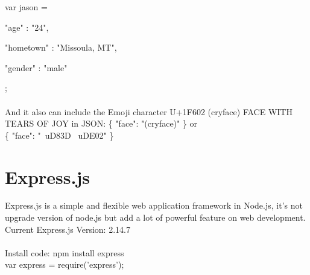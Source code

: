 var jason = {


"age" : "24",


"hometown" : "Missoula, MT",


"gender" : "male"

};\\
\\
And it also can include the Emoji character U+1F602 (cryface) FACE WITH TEARS OF JOY in JSON:
\{ "face": "(cryface)" \} or\\ 
\{ "face": "\ uD83D \ uDE02" \}
\\
\section{Express.js}	
Express.js is a simple and flexible web application framework in Node.js, it’s not upgrade version of node.js but add a lot of powerful feature on web development.\\
Current Express.js Version: 2.14.7\\
\\
Install code: npm install express\\
var express = require('express');\\
\\
